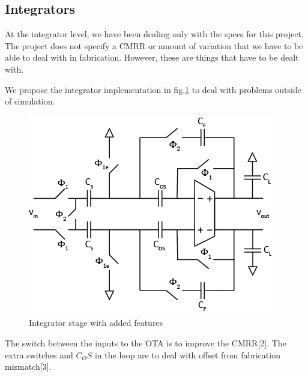 \documentclass[conference]{IEEEtran}
\begin{document}
\subsection{Integrators}
At the integrator level, we have been dealing only with the specs for this project. The project does not specify a CMRR or amount of variation that we have to be able to deal with in fabrication. However, these are things that have to be dealt with.

We propose the integrator implementation in fig.\ref{integrator3} to deal with problems outside of simulation.

\begin{figure}[h]
\centering
\includegraphics[width=0.4\linewidth]{illustrator/integrator3}
\caption{Integrator stage with added features}
\label{integrator3}
\end{figure}

The switch between the inputs to the OTA is to improve the CMRR[2]. The extra switches and $C_OS$ in the loop are to deal with offset from fabrication mismatch[3]. 







%
%
\end{document}
